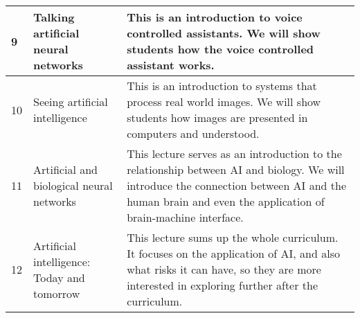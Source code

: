 \begin{table*}[]
\begin{tabular}{p{1cm} p{4cm} p{10cm}}
9 &Talking artificial neural networks&This is an introduction to voice controlled assistants. We will show students how the voice controlled assistant works.\\ \hline
10 &Seeing artificial intelligence&This is an introduction to systems that process real world images. We will show students how images are presented in computers and understood.\\ \hline
11 &Artificial and biological neural networks&This lecture serves as an introduction to the relationship between AI and biology. We will introduce the connection between AI and the human brain and even the application of brain-machine interface.\\ \hline
12 &Artificial intelligence:
Today and tomorrow&This lecture sums up the whole curriculum. It focuses on the application of AI, and also what risks it can have, so they are more interested in exploring further after the curriculum.\\ \hline
\end{tabular}
\end{table*}








